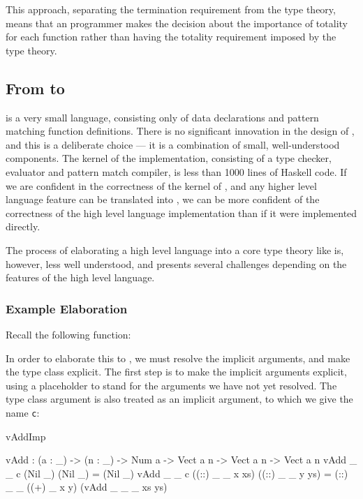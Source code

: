 This approach, separating the termination requirement from the type theory,
means that an \Idris{} programmer makes the decision about the importance of
totality for each function rather than having the totality requirement imposed
by the type theory.

\subsection{From \Idris{} to \TT{}}

\TT{} is a very small language, consisting only of data declarations and pattern matching
function definitions. There is no significant innovation in the design of \TT{}, and this
is a deliberate choice --- it is a combination of small, well-understood components.
The kernel of the \TT{} implementation, consisting of a type checker, evaluator and
pattern match compiler, is less than 1000 lines of Haskell code. If we are confident
in the correctness of the kernel of \TT{}, and any higher level language feature
can be translated into \TT{}, we can be more confident of the correctness of the high
level language implementation than if it were implemented directly.

The process of elaborating a high level language into a core type theory like \TT{} is,
however, less well understood, and presents several challenges depending on the
features of the high level language. 

\subsubsection{Example Elaboration}

Recall the following \Idris{} function:


\noindent
In order to elaborate
this to \TT{}, we must resolve the implicit arguments, and make the type class explicit.
The first step is to make the implicit arguments explicit, using a placeholder
to stand for the arguments we have not yet resolved. The type class argument is
also treated as an implicit argument, to which we give the name \texttt{c}:

\begin{SaveVerbatim}{vAddImp}

vAdd : (a : _) -> (n : _) -> Num a -> Vect a n -> Vect a n -> Vect a n
vAdd _ _ c (Nil _)         (Nil _)         = (Nil _)
vAdd _ _ c ((::) _ _ x xs) ((::) _ _ y ys) 
                = (::) _ _ ((+) _ x y) (vAdd _ _ _ xs ys)

\end{SaveVerbatim}


